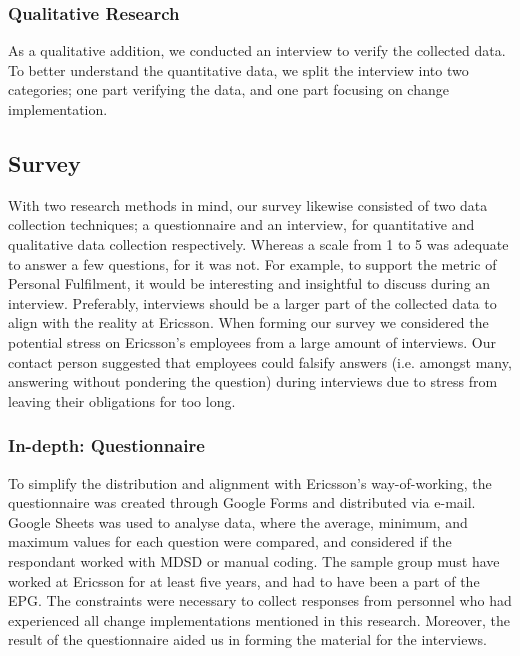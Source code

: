\documentclass[final_report_innit.tex]{subfiles}
\begin{document}
\subsubsection{Qualitative Research}\label{approachQual}
As a qualitative addition, we conducted an interview to verify the collected data. To better understand the quantitative data, we split the interview into two categories; one part verifying the data, and one part focusing on change implementation.

\subsection{Survey}\label{approachSurvey}
With two research methods in mind, our survey likewise consisted of two data collection techniques; a questionnaire and an interview, for quantitative and qualitative data collection respectively. Whereas a scale from 1 to 5 was adequate to answer a few questions, for it was not. For example, to support the metric of Personal Fulfilment, it would be interesting and insightful to discuss during an interview. Preferably, interviews should be a larger part of the collected data to align with the reality at Ericsson. When forming our survey we considered the potential stress on Ericsson's employees from a large amount of interviews. Our contact person suggested that employees could falsify answers (i.e. amongst many, answering without pondering the question) during interviews due to stress from leaving their obligations for too long. 
\\

\subsubsection{In-depth: Questionnaire}\label{approachInQuest}
To simplify the distribution and alignment with Ericsson's way-of-working, the questionnaire was created through Google Forms and distributed via e-mail. Google Sheets was used to analyse data, where the average, minimum, and maximum values for each question were compared, and considered if the respondant worked with MDSD or manual coding. The sample group must have worked at Ericsson for at least five years, and had to have been a part of the EPG. The constraints were necessary to collect responses from personnel who had experienced all change implementations mentioned in this research. Moreover, the result of the questionnaire aided us in forming the material for the interviews. 
\\
\end{document}
